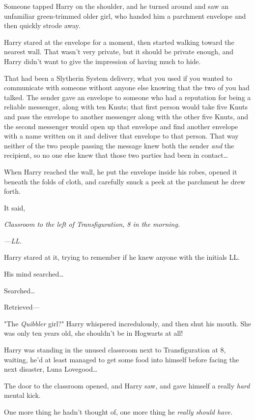 Someone tapped Harry on the shoulder, and he turned around and saw an
unfamiliar green-trimmed older girl, who handed him a parchment envelope and
then quickly strode away.

Harry stared at the envelope for a moment, then started walking toward the
nearest wall. That wasn't very private, but it should be private enough, and
Harry didn't want to give the impression of having much to hide.

That had been a Slytherin System delivery, what you used if you wanted to
communicate with someone without anyone else knowing that the two of you had
talked. The sender gave an envelope to someone who had a reputation for being a
reliable messenger, along with ten Knuts; that first person would take five
Knuts and pass the envelope to another messenger along with the other five
Knuts, and the second messenger would open up that envelope and find another
envelope with a name written on it and deliver that envelope to that person.
That way neither of the two people passing the message knew both the sender
\emph{and} the recipient, so no one else knew that those two parties had been
in contact…

When Harry reached the wall, he put the envelope inside his robes, opened it
beneath the folds of cloth, and carefully snuck a peek at the parchment he drew
forth.

It said,

\emph{Classroom to the left of Transfiguration, 8 in the morning.}

\emph{—LL.}

Harry stared at it, trying to remember if he knew anyone with the initials LL.

His mind searched…

Searched…

Retrieved—

"The \emph{Quibbler} girl?" Harry whispered incredulously, and then shut his
mouth. She was only ten years old, she shouldn't be in Hogwarts at all!

Harry was standing in the unused classroom next to Transfiguration at 8\AM,
waiting, he'd at least managed to get some food into himself before facing the
next disaster, Luna Lovegood…

The door to the classroom opened, and Harry saw, and gave himself a really
\emph{hard} mental kick.

One more thing he hadn't thought of, one more thing he \emph{really should
have.}

